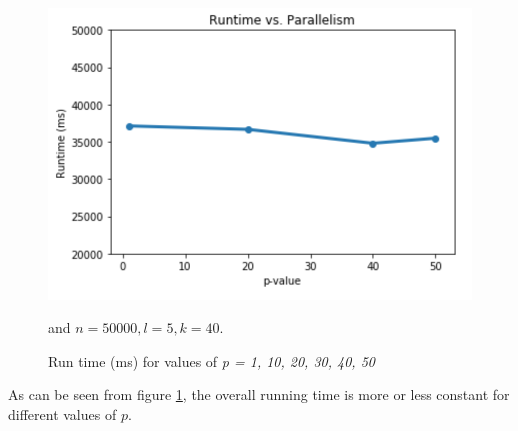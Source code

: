 \begin{figure}[H]
    \centering
    \includegraphics[scale=0.7]{Images/runtimepvals.png}
    \caption{Run time (ms) for values of  \textit{p = 1, 10, 20, 30, 40, 50}} and $n=50 000, l=5, k=40$.
    \label{fig:runtimepvals}
\end{figure}

\noindent As can be seen from figure \ref{fig:runtimepvals}, the overall running time is more or less constant for different values of $p$. 


